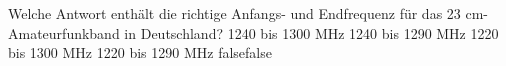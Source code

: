     {Welche Antwort enthält die richtige Anfangs- und Endfrequenz für das 23 cm-Amateurfunkband in Deutschland?}
    {1240 bis 1300 MHz}
    {1240 bis 1290 MHz}
    {1220 bis 1300 MHz}
    {1220 bis 1290 MHz}
    {false}{false}
